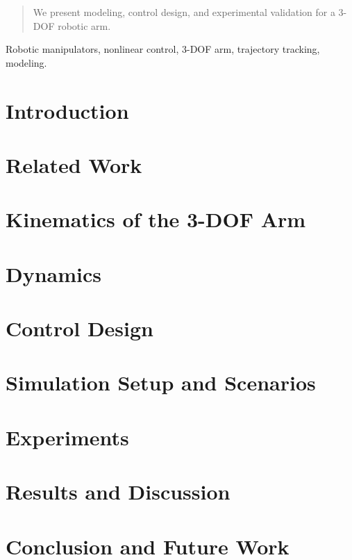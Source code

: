 \documentclass[conference]{IEEEtran} %
\begin{document}
\maketitle
\begin{abstract}
We present modeling, control design, and experimental validation for a 3-DOF robotic arm.
\end{abstract}

\begin{IEEEkeywords}
Robotic manipulators, nonlinear control, 3-DOF arm, trajectory tracking, modeling.
\end{IEEEkeywords}

\section{Introduction}\label{sec:intro}


\section{Related Work}\label{sec:related}


\section{Kinematics of the 3-DOF Arm}\label{sec:kin}


\section{Dynamics}\label{sec:dynamics}


\section{Control Design}\label{sec:control}


\section{Simulation Setup and Scenarios}\label{sec:sim}


\section{Experiments}\label{sec:exp}


\section{Results and Discussion}\label{sec:results}


\section{Conclusion and Future Work}\label{sec:conclusion}




\end{document}
